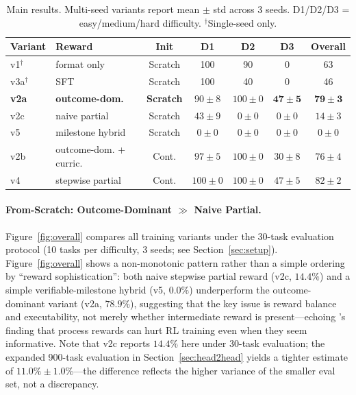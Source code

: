 \documentclass[11pt]{article}
\begin{document}
\begin{table}[t]
\centering
\caption{Main results. Multi-seed variants report mean $\pm$ std across 3 seeds. D1/D2/D3 = easy/medium/hard difficulty. $^\dagger$Single-seed only.}
\label{tab:main}
\small
\begin{tabular}{@{}llccccc@{}}
\toprule
\textbf{Variant} & \textbf{Reward} & \textbf{Init} & \textbf{D1} & \textbf{D2} & \textbf{D3} & \textbf{Overall} \\
\midrule
v1$^\dagger$ & format only & Scratch & 100 & 90 & 0 & 63 \\
v3a$^\dagger$ & SFT & Scratch & 100 & 40 & 0 & 46 \\
\midrule
\textbf{v2a} & \textbf{outcome-dom.} & \textbf{Scratch} & $90{\pm}8$ & $100{\pm}0$ & $\mathbf{47{\pm}5}$ & $\mathbf{79{\pm}3}$ \\
v2c & naive partial & Scratch & $43{\pm}9$ & $0{\pm}0$ & $0{\pm}0$ & $14{\pm}3$ \\
v5 & milestone hybrid & Scratch & $0{\pm}0$ & $0{\pm}0$ & $0{\pm}0$ & $0{\pm}0$ \\
\midrule
v2b & outcome-dom. + curric. & Cont. & $97{\pm}5$ & $100{\pm}0$ & $30{\pm}8$ & $76{\pm}4$ \\
v4 & stepwise partial & Cont. & $100{\pm}0$ & $100{\pm}0$ & $47{\pm}5$ & $82{\pm}2$ \\
\bottomrule
\end{tabular}
\end{table}

\paragraph{From-Scratch: Outcome-Dominant $\gg$ Naive Partial.}
Figure~\ref{fig:overall} compares all training variants under the 30-task evaluation protocol (10 tasks per difficulty, 3 seeds; see Section~\ref{sec:setup}).
Figure~\ref{fig:overall} shows a non-monotonic pattern rather than a simple ordering by ``reward sophistication'': both naive stepwise partial reward (v2c, $14.4\%$) and a simple verifiable-milestone hybrid (v5, $0.0\%$) underperform the outcome-dominant variant (v2a, $78.9\%$), suggesting that the key issue is reward balance and executability, not merely whether intermediate reward is present---echoing \citet{gao2024designing}'s finding that process rewards can hurt RL training even when they seem informative.
Note that v2c reports $14.4\%$ here under 30-task evaluation; the expanded 900-task evaluation in Section~\ref{sec:head2head} yields a tighter estimate of $11.0\% \pm 1.0\%$---the difference reflects the higher variance of the smaller eval set, not a discrepancy.
\end{document}
